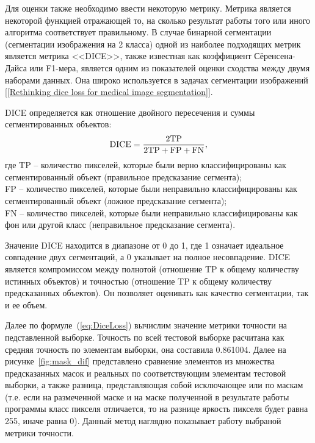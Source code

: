 \documentclass[14pt, a4paper]{extreport}
\begin{document}
	Для оценки также необходимо ввести некоторую метрику. Метрика является некоторой функцией отражающей то, на сколько результат работы того или иного алгоритма соответствует правильному. В случае бинарной сегментации (сегментации изображения на 2 класса) одной из наиболее подходящих метрик является метрика <<DICE>>, также известная как коэффициент Сёренсена-Дайса или F1-мера, является одним из показателей оценки сходства между двумя наборами данных. Она широко используется в задачах сегментации изображений [\ref{Rethinking dice loss for medical image segmentation}].
	
	DICE определяется как отношение двойного пересечения и суммы сегментированных объектов:
	\begin{equation}
		\textup{DICE} = \frac{2\textup{TP}}{2\textup{TP} + \textup{FP} + \textup{FN}},
		\label{eq:DiceLoss}
	\end{equation}
	где TP -- количество пикселей, которые были верно классифицированы как сегментированный объект (правильное предсказание сегмента);\\
	\hspace*{0.8cm}FP -- количество пикселей, которые были неправильно классифицированы как сегментированный объект (ложное предсказание сегмента);\\
	\hspace*{0.8cm}FN -- количество пикселей, которые были неправильно классифицированы как фон или другой класс (неправильное предсказание сегмента).
	
	Значение DICE находится в диапазоне от 0 до 1, где 1 означает идеальное совпадение двух сегментаций, а 0 указывает на полное несовпадение. DICE является компромиссом между полнотой (отношение TP к общему количеству истинных объектов) и точностью (отношение TP к общему количеству предсказанных объектов). Он позволяет оценивать как качество сегментации, так и ее объем.
	
	Далее по формуле~(\ref{eq:DiceLoss}) вычислим значение метрики точности на педставленной выборке. Точность по всей тестовой выборке расчитана как средняя точность по элементам выборки, она составила 0.861004. Далее на рисунке~\ref{fig:mask_dif} представлено сравнение элементов из множества предсказанных масок и реальных по соответствующим элементам тестовой выборки, а также разница, представляющая собой исключающее или по маскам (т.е. если на размеченной маске и на маске полученной в результате работы программы класс пикселя отличается, то на разнице яркость пикселя будет равна 255, иначе равна 0). Данный метод наглядно показывает работу выбраной метрики точности.
	
\end{document}
